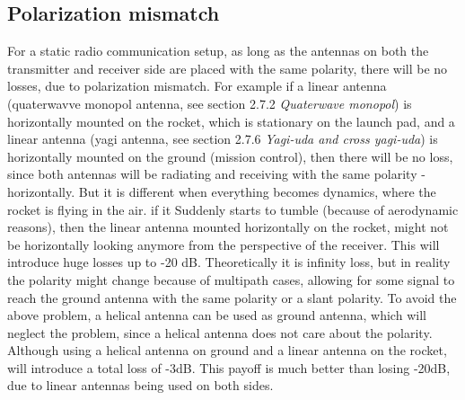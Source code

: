 \subsection{Polarization mismatch}
For a static radio communication setup, as long as the antennas on both the transmitter and receiver side are placed with the same polarity, there will be no losses, due to polarization mismatch. For example if a linear antenna (quaterwavve monopol antenna, see section 2.7.2 \textit{Quaterwave monopol}) is horizontally mounted on the rocket, which is stationary on the launch pad, and a linear antenna (yagi antenna, see section 2.7.6 \textit{Yagi-uda and cross yagi-uda}) is horizontally mounted on the ground (mission control), then there will be no loss, since both antennas will be radiating and receiving with the same polarity - horizontally. But it is different when everything becomes dynamics, where the rocket is flying in the air. if it Suddenly starts to tumble (because of aerodynamic reasons), then the linear antenna mounted horizontally on the rocket, might not be horizontally looking anymore from the perspective of the receiver. This will introduce huge losses up to -20 dB. Theoretically it is infinity loss, but in reality the polarity might change because of multipath cases, allowing for some signal to reach the ground antenna with the same polarity or a slant polarity. To avoid the above problem, a helical antenna can be used as ground antenna, which will neglect the problem, since a helical antenna does not care about the polarity. Although using a helical antenna on ground and a linear antenna on the rocket, will introduce a total loss of -3dB. This payoff is much better than losing -20dB, due to linear antennas being used on both sides.   


